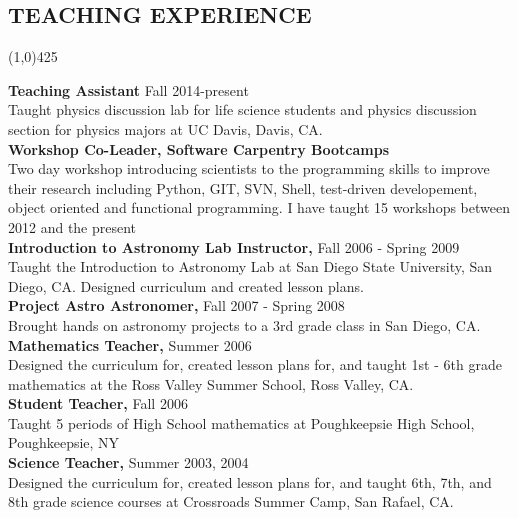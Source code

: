 \documentclass{res}
\begin{document}
\begin{resume}
\section{TEACHING EXPERIENCE}
\vspace{-.2in} 
\begin{center}
\line(1,0){425}
\end{center}
\vspace{-.24in} 
\vspace{0.1in}
   {\bf Teaching Assistant} Fall 2014-present \\
        Taught physics discussion lab for life science students and physics discussion section for physics majors at UC Davis, Davis, CA. \\
   {\bf  Workshop Co-Leader, Software Carpentry Bootcamps } \\
         Two day workshop introducing scientists to the programming skills to improve their research including Python, GIT, SVN, Shell, test-driven developement, object oriented and functional programming. I have taught 15 workshops between 2012 and the present \\		 
   {\bf  Introduction to Astronomy Lab Instructor,} Fall 2006 - Spring 2009  \\
         Taught the Introduction to Astronomy Lab at San Diego State University, San Diego, CA. 
         Designed curriculum and created lesson plans. \\
   {\bf Project Astro Astronomer, } Fall 2007 - Spring 2008 \\
   		Brought hands on astronomy projects to a 3rd grade class in San Diego, CA. \\
   {\bf Mathematics Teacher, } Summer 2006 \\
   		Designed the curriculum for, created lesson plans for, and taught 1st - 6th grade 
   		mathematics at the Ross Valley Summer School, Ross Valley, CA. \\	
   {\bf Student Teacher, } Fall 2006 \\
   		Taught 5 periods of High School mathematics at Poughkeepsie High School, Poughkeepsie, NY \\
   {\bf Science Teacher, } Summer 2003, 2004 \\
   		Designed the curriculum for, created lesson plans for, and taught 6th, 7th, and 8th grade 
   		science courses at Crossroads Summer Camp, San Rafael, CA.


\end{resume}
\end{document}
